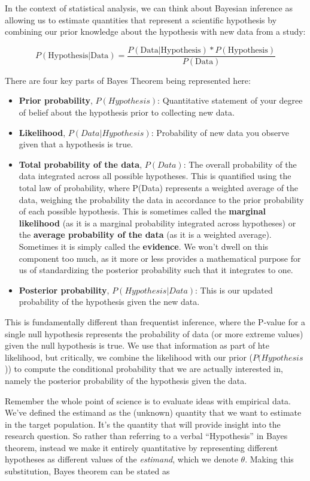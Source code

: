 \documentclass[
]{book}
\providecommand{\tightlist}{%
  \setlength{\itemsep}{0pt}\setlength{\parskip}{0pt}}
\begin{document}
In the context of statistical analysis, we can think about Bayesian
inference as allowing us to estimate quantities that represent a
scientific hypothesis by combining our prior knowledge about the
hypothesis with new data from a study:

\[
P(\text{Hypothesis}|\text{Data}) = \frac{P(\text{Data|Hypothesis})*P(\text{Hypothesis})}{P(\text{Data})}
\]

There are four key parts of Bayes Theorem being represented here:

\begin{itemize}
\tightlist
\item
  \textbf{Prior probability}, \(P(Hypothesis)\): Quantitative statement of
  your degree of belief about the hypothesis prior to collecting new
  data.
\item
  \textbf{Likelihood}, \(P(Data|Hypothesis)\): Probability of new data you
  observe given that a hypothesis is true.
\item
  \textbf{Total probability of the data}, \(P(Data)\): The overall
  probability of the data integrated across all possible hypotheses.
  This is quantified using the total law of probability, where P(Data)
  represents a weighted average of the data, weighing the probability
  the data in accordance to the prior probability of each possible
  hypothesis. This is sometimes called the \textbf{marginal likelihood} (as
  it is a marginal probability integrated across hypotheses) or the
  \textbf{average probability of the data} (as it is a weighted average).
  Sometimes it is simply called the \textbf{evidence}. We won't dwell on
  this component too much, as it more or less provides a mathematical
  purpose for us of standardizing the posterior probability such that
  it integrates to one.
\item
  \textbf{Posterior probability}, \(P(Hypothesis | Data)\): This is our
  updated probability of the hypothesis given the new data.
\end{itemize}

This is fundamentally different than frequentist inference, where the
P-value for a single null hypothesis represents the probability of data
(or more extreme values) given the null hypothesis is true. We use that
information as part of hte likelihood, but critically, we combine the
likelihood with our prior (\(P(Hypothesis\))) to compute the conditional
probability that we are actually interested in, namely the posterior
probability of the hypothesis given the data.

Remember the whole point of science is to evaluate ideas with empirical
data. We've defined the estimand as the (unknown) quantity that we want
to estimate in the target population. It's the quantity that will
provide insight into the research question. So rather than referring to
a verbal ``Hypothesis'' in Bayes theorem, instead we make it entirely
quantitative by representing different hypotheses as different values of
the \emph{estimand}, which we denote \(\theta\). Making this substitution,
Bayes theorem can be stated as
\end{document}

